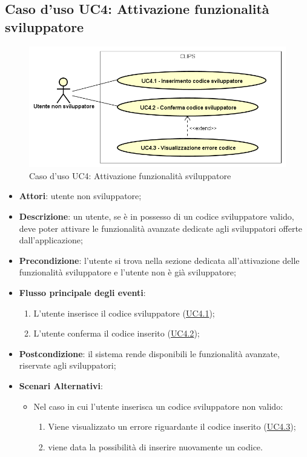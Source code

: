 \documentclass[../AnalisiDeiRequisiti.tex]{subfiles}
\begin{document}
\subsection{Caso d'uso UC4: Attivazione funzionalità sviluppatore}

        \begin{figure}[!h]
            \centering
            \includegraphics[scale=0.95, width=\textwidth]{img/UC4.png}
            \caption{Caso d'uso UC4: Attivazione funzionalità sviluppatore}\label{fig:UC4} 
        \end{figure}
\begin{itemize}
\item \textbf{Attori}: utente non sviluppatore;
\item \textbf{Descrizione}: un utente, se è in possesso di un codice sviluppatore valido, deve poter attivare le funzionalità avanzate dedicate agli sviluppatori offerte dall'applicazione; 
      \item \textbf{Precondizione}: l'utente si trova nella sezione dedicata all'attivazione delle funzionalità sviluppatore e l'utente non è già sviluppatore;

        \item \textbf{Flusso principale degli eventi}:
          \begin{enumerate}
          \item L'utente inserisce il codice sviluppatore (\hyperlink{UC4.1}{UC4.1});
          \item L'utente conferma il codice inserito (\hyperlink{UC4.2}{UC4.2});

      \end{enumerate}
   \item \textbf{Postcondizione}: il sistema rende disponibili le funzionalità avanzate, riservate agli sviluppatori;
    \item \textbf{Scenari Alternativi}:
    	\begin{itemize}
    		\item Nel caso in cui l'utente inserisca un codice sviluppatore non valido:
    		\begin{enumerate}
    			\item Viene visualizzato un errore riguardante il codice inserito (\hyperlink{UC4.3}{UC4.3});
    			\item viene data la possibilità di inserire nuovamente un codice.
    			
    		\end{enumerate}
    	\end{itemize}

 
  \end{itemize}
\hypertarget{UC4.1}{}
\end{document}
